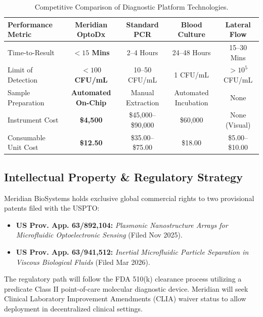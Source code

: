 \documentclass[11pt,a4paper]{scrartcl}
\begin{document}
\begin{table}[htbp]
\centering
\small
\caption{Competitive Comparison of Diagnostic Platform Technologies.}
\vspace{2pt}
\begin{tabularx}{\textwidth}{X c c c c}
\toprule
\textbf{\textcolor{NavyBlue}{Performance Metric}} & \textbf{\textcolor{NavyBlue}{Meridian OptoDx}} & \textbf{\textcolor{NavyBlue}{Standard PCR}} & \textbf{\textcolor{NavyBlue}{Blood Culture}} & \textbf{\textcolor{NavyBlue}{Lateral Flow}} \\
\midrule
Time-to-Result & \textbf{$< 15$ Mins} & 2--4 Hours & 24--48 Hours & 15--30 Mins \\{}
Limit of Detection & \textbf{$< 100$ CFU/mL} & 10--50 CFU/mL & 1 CFU/mL & $> 10^5$ CFU/mL \\{}
Sample Preparation & \textbf{Automated On-Chip} & Manual Extraction & Automated Incubation & None \\{}
Instrument Cost & \textbf{\$4,500} & \$45,000--\$90,000 & \$60,000 & None (Visual) \\{}
Consumable Unit Cost & \textbf{\$12.50} & \$35.00--\$75.00 & \$18.00 & \$5.00--\$10.00 \\
\bottomrule
\end{tabularx}
\end{table}

\subsection{Intellectual Property \& Regulatory Strategy}
Meridian BioSystems holds exclusive global commercial rights to two provisional patents filed with the USPTO:
\begin{itemize}
    \item \textbf{US Prov. App. 63/892,104:} \emph{Plasmonic Nanostructure Arrays for Microfluidic Optoelectronic Sensing} (Filed Nov 2025).
    \item \textbf{US Prov. App. 63/941,512:} \emph{Inertial Microfluidic Particle Separation in Viscous Biological Fluids} (Filed Mar 2026).
\end{itemize}
The regulatory path will follow the FDA 510(k) clearance process utilizing a predicate Class II point-of-care molecular diagnostic device. Meridian will seek Clinical Laboratory Improvement Amendments (CLIA) waiver status to allow deployment in decentralized clinical settings.
\end{document}
